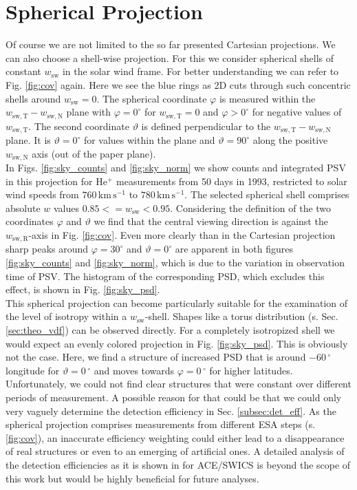 \section{Spherical Projection}
Of course we are not limited to the so far presented Cartesian projections.
We can also choose a shell-wise projection. For this we consider spherical shells of constant $w_\mathrm{sw}$ in the solar wind frame. For better understanding we can refer to Fig. \ref{fig:cov} again. Here we see the blue rings as 2D cuts through such concentric shells around $w_\mathrm{sw} = 0$. The spherical coordinate $\varphi$ is measured within the $w_\mathrm{sw,T}-w_\mathrm{sw,N}$ plane with $\varphi = 0^\circ$ for $w_\mathrm{sw,T} = 0$ and $\varphi > 0^\circ$ for negative values of $w_\mathrm{sw,T}$. The second coordinate $\vartheta$ is defined perpendicular to the $w_\mathrm{sw,T}-w_\mathrm{sw,N}$ plane. It is $\vartheta = 0 ^\circ$ for values within the plane and $\vartheta = 90^\circ$ along the positive $w_\mathrm{sw,N}$ axis (out of the paper plane).
\\
In Figs. \ref{fig:sky_counts} and \ref{fig:sky_norm} we show counts and integrated PSV in this projection for $\mathrm{He^{+}}$ measurements from 50 days in 1993, restricted to solar wind speeds from $760 \, \mathrm{km\,s^{-1}}$ to $780 \, \mathrm{km\,s^{-1}}$. The selected spherical shell comprises absolute $w$ values $0.85 <= w_\mathrm{sw} < 0.95$. Considering the definition of the two coordinates $\varphi$ and $\vartheta$ we find that the central viewing direction is against the $w_\mathrm{sw,R}$-axis in Fig. \ref{fig:cov}. Even more clearly than in the Cartesian projection sharp peaks around $\varphi = 30 ^\circ$ and $\vartheta = 0 ^\circ$ are apparent in both figures \ref{fig:sky_counts} and \ref{fig:sky_norm}, which is due to the variation in observation time of PSV. The histogram of the corresponding PSD, which excludes this effect, is shown in Fig. \ref{fig:sky_psd}.\\
This spherical projection can become particularly suitable for the examination of the level of isotropy within a $w_\mathrm{sw}$-shell. Shapes like a torus distribution (s. Sec. \ref{sec:theo_vdf}) can be observed directly. For a completely isotropized shell we would expect an evenly colored projection in Fig. \ref{fig:sky_psd}. This is obviously not the case. Here, we find a structure of increased PSD that is around $-60\,^\circ$ longitude for $\vartheta = 0\,^\circ$ and moves towards $\varphi = 0\,^\circ$ for higher latitudes.
\\
Unfortunately, we could not find clear structures that were constant over different periods of measurement. A possible reason for that could be that we could only very vaguely determine the detection efficiency in Sec. \ref{subsec:det_eff}. As the spherical projection comprises measurements from different ESA steps (s. \ref{fig:cov}), an inaccurate efficiency weighting could either lead to a disappearance of real structures or even to an emerging of artificial ones. A detailed analysis of the detection efficiencies as it is shown in \citet{koeten} for ACE/SWICS is beyond the scope of this work but would be highly beneficial for future analyses.
